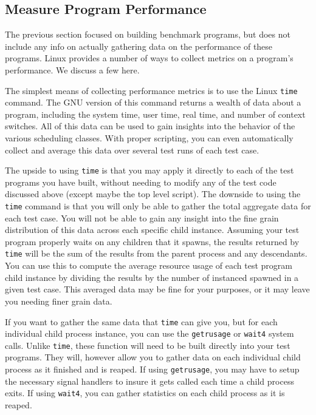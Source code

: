 \documentclass[12pt]{article}
\begin{document}
\subsection{Measure Program Performance}

The previous section focused on building benchmark programs, but does
not include any info on actually gathering data on the performance of
these programs. Linux provides a number of ways to collect metrics on
a program's performance. We discuss a few here.

The simplest means of collecting performance metrics is to use the Linux
\texttt{time} command. The GNU version of this command returns a
wealth of data about a program, including the system time, user time,
real time, and number of context switches. All of this data can be
used to gain insights into the behavior of the various scheduling
classes. With proper scripting, you can even automatically collect and
average this data over several test runs of each test case.

The upside to using \texttt{time} is that you may apply it directly to each of
the test programs you have built, without needing to modify any of the
test code discussed above (except maybe the top level script).
The downside to using the \texttt{time} command is that you will only be able to gather
the total aggregate data for each test case. You will not be able to gain any
insight into the fine grain distribution of this data across each
specific child instance. Assuming your test program properly waits
on any children that it spawns, the results returned by \texttt{time}
will be the sum of the results from the parent process and any
descendants. You can use this to compute the average resource usage of
each test program child instance by dividing the results by the number
of instanced spawned in a given test case.
This averaged data may be fine for your
purposes, or it may leave you needing finer grain data.

If you want to gather the same data that \texttt{time} can give you,
but for each individual child process instance, you can use the
\texttt{getrusage} or \texttt{wait4} system calls. Unlike
\texttt{time}, these function will need to be built
directly into your test programs. They will, however allow you to
gather data on each individual child process as it finished and is
reaped. If using \texttt{getrusage}, you may have to setup
the necessary signal handlers to insure it gets
called each time a child process exits. If using \texttt{wait4}, you
can gather statistics on each child process as it is reaped.
\end{document}
